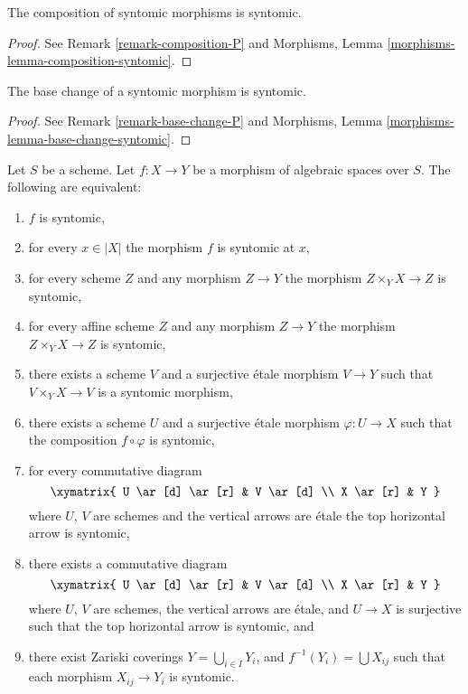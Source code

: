 \begin{lemma}
\label{lemma-composition-syntomic}
The composition of syntomic morphisms is syntomic.
\end{lemma}

\begin{proof}
See Remark \ref{remark-composition-P} and
Morphisms, Lemma \ref{morphisms-lemma-composition-syntomic}.
\end{proof}

\begin{lemma}
\label{lemma-base-change-syntomic}
The base change of a syntomic morphism is syntomic.
\end{lemma}

\begin{proof}
See Remark \ref{remark-base-change-P} and
Morphisms, Lemma \ref{morphisms-lemma-base-change-syntomic}.
\end{proof}

\begin{lemma}
\label{lemma-syntomic-local}
Let $S$ be a scheme.
Let $f : X \to Y$ be a morphism of algebraic spaces over $S$.
The following are equivalent:
\begin{enumerate}
\item $f$ is syntomic,
\item for every $x \in |X|$ the morphism $f$ is syntomic at $x$,
\item for every scheme $Z$ and any morphism $Z \to Y$ the morphism
$Z \times_Y X \to Z$ is syntomic,
\item for every affine scheme $Z$ and any morphism
$Z \to Y$ the morphism $Z \times_Y X \to Z$ is syntomic,
\item there exists a scheme $V$ and a surjective \'etale morphism
$V \to Y$ such that $V \times_Y X \to V$ is a syntomic morphism,
\item there exists a scheme $U$ and a surjective \'etale morphism
$\varphi : U \to X$ such that the composition $f \circ \varphi$
is syntomic,
\item for every commutative diagram
$$
\xymatrix{
U \ar[d] \ar[r] & V \ar[d] \\
X \ar[r] & Y
}
$$
where $U$, $V$ are schemes and the vertical arrows are \'etale
the top horizontal arrow is syntomic,
\item there exists a commutative diagram
$$
\xymatrix{
U \ar[d] \ar[r] & V \ar[d] \\
X \ar[r] & Y
}
$$
where $U$, $V$ are schemes, the vertical arrows are \'etale, and
$U \to X$ is surjective such that the top horizontal arrow is syntomic, and
\item there exist Zariski coverings $Y = \bigcup_{i \in I} Y_i$,
and $f^{-1}(Y_i) = \bigcup X_{ij}$ such that
each morphism $X_{ij} \to Y_i$ is syntomic.
\end{enumerate}
\end{lemma}

